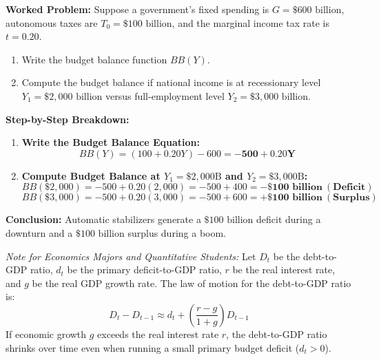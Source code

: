 \documentclass[11pt,letterpaper]{article}
\begin{document}
\noindent\textbf{Worked Problem:}
Suppose a government's fixed spending is $G = \$600\text{ billion}$, autonomous taxes are $T_0 = \$100\text{ billion}$, and the marginal income tax rate is $t = 0.20$.
\begin{enumerate}
    \item Write the budget balance function $BB(Y)$.
    \item Compute the budget balance if national income is at recessionary level $Y_1 = \$2{,}000\text{ billion}$ versus full-employment level $Y_2 = \$3{,}000\text{ billion}$.
\end{enumerate}

\noindent\textbf{Step-by-Step Breakdown:}
\begin{enumerate}
    \item \textbf{Write the Budget Balance Equation:}
    \[
    BB(Y) = (100 + 0.20Y) - 600 = \mathbf{-500 + 0.20Y}
    \]

    \item \textbf{Compute Budget Balance at $Y_1 = \$2{,}000\text{B}$ and $Y_2 = \$3{,}000\text{B}$:}
    \[
    BB(\$2{,}000) = -500 + 0.20(2{,}000) = -500 + 400 = \mathbf{-\$100\text{ billion}\ (\text{Deficit})}
    \]
    \[
    BB(\$3{,}000) = -500 + 0.20(3{,}000) = -500 + 600 = \mathbf{+\$100\text{ billion}\ (\text{Surplus})}
    \]
\end{enumerate}
\textbf{Conclusion:} Automatic stabilizers generate a $\$100\text{ billion}$ deficit during a downturn and a $\$100\text{ billion}$ surplus during a boom.

\begin{tcolorbox}[colback=blue!5!white,colframe=blue!75!black,title=\textbf{Optional Advanced Section: Debt-to-GDP Dynamics Equation}]
\small
\emph{Note for Economics Majors and Quantitative Students:}
Let $D_t$ be the debt-to-GDP ratio, $d_t$ be the primary deficit-to-GDP ratio, $r$ be the real interest rate, and $g$ be the real GDP growth rate. The law of motion for the debt-to-GDP ratio is:
\[
D_t - D_{t-1} \approx d_t + \left( \frac{r - g}{1 + g} \right) D_{t-1}
\]
If economic growth $g$ exceeds the real interest rate $r$, the debt-to-GDP ratio shrinks over time even when running a small primary budget deficit ($d_t > 0$).
\end{tcolorbox}
\end{document}
